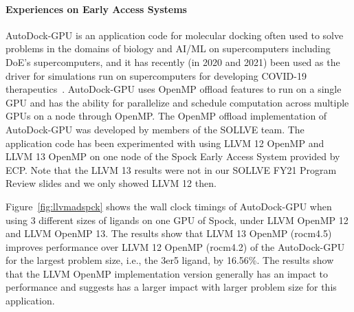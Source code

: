 \paragraph{Experiences on Early Access Systems}


AutoDock-GPU is an application code for molecular docking often used to solve problems in the domains of biology and AI/ML on supercomputers including DoE's supercomputers, and it has recently (in 2020 and 2021) been used as the driver for simulations run on supercomputers for developing COVID-19 therapeutics~\cite{legrand2020gpu}. AutoDock-GPU uses OpenMP offload features to run on a single GPU and has the ability for parallelize and schedule computation across multiple GPUs on a node through OpenMP. The OpenMP offload implementation of AutoDock-GPU was developed by members of the SOLLVE team. The application code has been experimented with using LLVM 12 OpenMP and LLVM 13 OpenMP on one node of the Spock Early Access System provided by ECP. Note that the LLVM 13 results were not in our SOLLVE FY21 Program Review slides and we only showed LLVM 12 then.

Figure~\ref{fig:llvmadspck} shows the wall clock timings of AutoDock-GPU when using 3 different sizes of ligands on one GPU of Spock, under LLVM OpenMP 12 and LLVM OpenMP 13. The results show that LLVM 13 OpenMP (rocm4.5) improves performance over LLVM 12 OpenMP (rocm4.2) of the AutoDock-GPU for the largest problem size, i.e., the 3er5 ligand, by 16.56\%. The results show that the LLVM OpenMP implementation version generally has an impact to performance and suggests has a larger impact with larger problem size for this application. 

